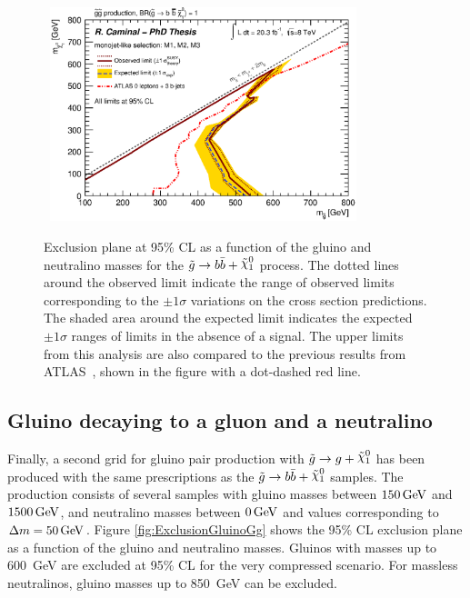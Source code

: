 \begin{figure}[!ht]
  \begin{center}
    \mbox{
      \includegraphics[width=0.795\textwidth]{Interpretations/Figures/limitPlotGluinoGbb_Stop_combined_M1_M2_M3_.eps}
    }
  \end{center}
  \caption[Exclusion plane at 95\% CL for gluino pair production with $\gluinotobb$ as a function of the $m_{\gluino}$ and $m_{\ninoone}$]{Exclusion plane at 95\% CL as a function of the gluino and neutralino masses for the $\gluinotobb$ process. The dotted lines around the observed limit indicate the range of observed limits corresponding to the $\pm 1 \sigma$ variations on the cross section predictions. The shaded area around the expected limit indicates the expected $\pm 1 \sigma$ ranges of limits in the absence of a signal.
  The upper limits from this analysis are also compared to the previous results from ATLAS~\cite{TheATLAScollaboration:2013tha}, shown in the figure with a dot-dashed red line.}
  \label{fig:ExclusionGluinoGbb}
\end{figure}


\subsection{Gluino decaying to a gluon and a neutralino}

Finally, a second grid for gluino pair production with $\gluinotog$ has been produced with the same prescriptions as the $\gluinotobb$ samples.
The production consists of several samples with gluino masses between $\unit[150]{GeV}$ and $\unit[1500]{GeV}$, and neutralino masses between $\unit[0]{GeV}$ and values corresponding to $\Delta m = \unit[50]{GeV}$.
Figure \ref{fig:ExclusionGluinoGg} shows the 95\% CL exclusion plane as a function of the gluino and neutralino masses.
Gluinos with masses up to 600~GeV are excluded at 95\% CL for the very compressed scenario.
For massless neutralinos, gluino masses up to 850~GeV can be excluded.

